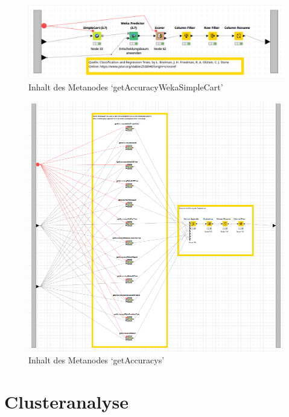 \documentclass[12pt,					%
							 oneside,			%
							 a4paper,			%
							 halfparskip,		%
							 liststotoc,			%
							 bibtotoc,			%
							 fleqn,				%
							 pointlessnumbers]	%
							 {scrreprt}
\begin{document}
		\begin{figure}[h]
			\begin{center}
				\includegraphics[scale=0.35]{pictures/trees-workflow-weka-example.png}
				\caption{Inhalt des Metanodes `getAccuracyWekaSimpleCart'}									
				\label{figure:trees:workflow:example:weka}
			\end{center}
		\end{figure}
		
		\begin{figure}[h]
			\begin{center}
				\includegraphics[scale=0.45]{pictures/trees-workflow-getAccuracys.png}
				\caption{Inhalt des Metanodes `getAccuracys'}									
				\label{figure:trees:workflow:getaccuracys}
			\end{center}
		\end{figure}

	\section{Clusteranalyse}
\end{document}
